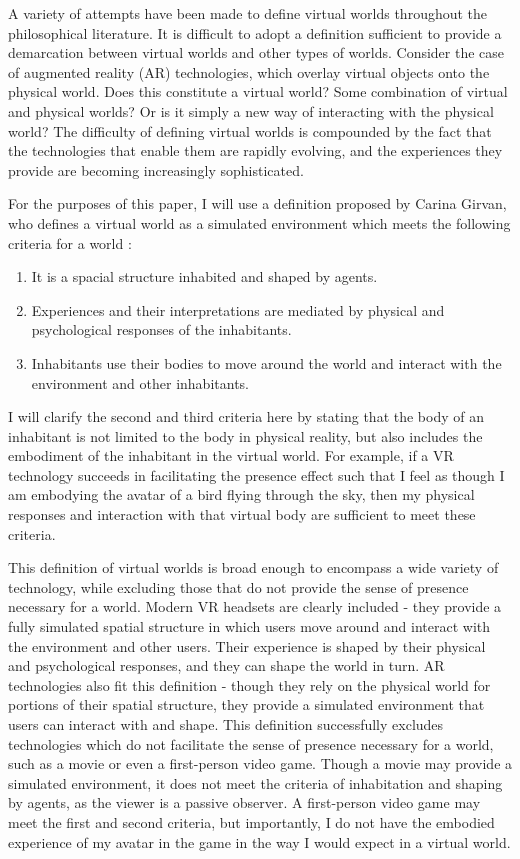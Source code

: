 A variety of attempts have been made to define virtual worlds throughout the
philosophical literature. It is difficult to adopt a definition sufficient to 
provide a demarcation between virtual worlds and other types of worlds.
Consider the case of augmented reality (AR) technologies, which overlay virtual
objects onto the physical world. Does this constitute a virtual world? Some
combination of virtual and physical worlds? Or is it simply a new way of
interacting with the physical world? The difficulty of defining virtual worlds
is compounded by the fact that the technologies that enable them are rapidly
evolving, and the experiences they provide are becoming increasingly
sophisticated.

For the purposes of this paper, I will use a definition proposed by Carina
Girvan, who defines a virtual world as a simulated environment which meets the
following criteria for a world \citep{Girvan2018}:
\begin{enumerate}
    \item It is a spacial structure inhabited and shaped by agents.
    \item Experiences and their interpretations are mediated by physical and
          psychological responses of the inhabitants.
    \item Inhabitants use their bodies to move around the world and interact
          with the environment and other inhabitants.
\end{enumerate}
I will clarify the second and third criteria here by stating that the body of 
an inhabitant is not limited to the body in physical reality, but also includes
the embodiment of the inhabitant in the virtual world. For example, if a VR 
technology succeeds in facilitating the presence effect such that I feel as
though I am embodying the avatar of a bird flying through the sky, then my 
physical responses and interaction with that virtual body are sufficient to 
meet these criteria.

This definition of virtual worlds is broad enough to encompass a wide variety
of technology, while excluding those that do not provide the sense of presence
necessary for a world. Modern VR headsets are clearly included - they provide a
fully simulated spatial structure in which users move around and interact with
the environment and other users. Their experience is shaped by their physical
and psychological responses, and they can shape the world in turn. AR
technologies also fit this definition - though they rely on the physical world 
for portions of their spatial structure, they provide a simulated environment
that users can interact with and shape. This definition successfully excludes
technologies which do not facilitate the sense of presence necessary for a
world, such as a movie or even a first-person video game. Though a movie may
provide a simulated environment, it does not meet the criteria of inhabitation
and shaping by agents, as the viewer is a passive observer. A first-person video
game may meet the first and second criteria, but importantly, I do not have the
embodied experience of my avatar in the game in the way I would expect in a 
virtual world.

